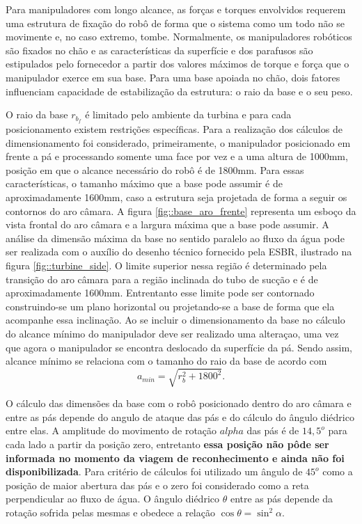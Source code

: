 Para manipuladores com longo alcance, as forças e torques envolvidos requerem
uma estrutura de fixação do robô de forma que o sistema como um todo não se
movimente e, no caso extremo, tombe. Normalmente, os manipuladores robóticos são
fixados no chão e as características da superfície e dos parafusos são
estipulados pelo fornecedor a partir dos valores máximos de torque e força que o
manipulador exerce em sua base. Para uma base apoiada no chão, dois fatores
influenciam capacidade de estabilização da estrutura: o raio da base e o seu
peso.

O raio da base $r_{b_f}$ é limitado pelo ambiente da turbina e para cada
posicionamento existem restrições específicas. 
Para a realização dos cálculos de dimensionamento foi considerado,
primeiramente, o manipulador posicionado em frente a pá e processando somente uma face por vez
e a uma altura de 1000mm, posição em que o alcance necessário do robô é de
1800mm. Para essas características, o tamanho máximo que a base pode assumir é
de aproximadamente 1600mm, caso a estrutura seja projetada de forma a seguir os contornos do aro câmara.
A figura \ref{fig::base_aro_frente} %
representa um esboço da vista frontal do aro câmara e a largura máxima que a
base pode assumir. A análise da dimensão máxima da base no sentido paralelo ao
fluxo da água pode ser realizada com o auxílio do desenho técnico fornecido pela
ESBR, ilustrado na figura \ref{fig::turbine_side}. O limite superior nessa
região é determinado pela transição do aro câmara para a região inclinada do
tubo de sucção e é de aproximadamente 1600mm. Entrentanto esse limite pode ser
contornado construindo-se um plano horizontal ou projetando-se a base de forma que ela acompanhe essa
inclinação. Ao se incluir o dimensionamento da base no cálculo do alcance mínimo
do manipulador deve ser realizado uma alteraçao, uma vez que agora o manipulador
se encontra deslocado da superfície da pá. Sendo assim, alcance mínimo se
relaciona com o tamanho do raio da base de acordo com
$$a_{min}=\sqrt{r_b^2+1800^2}.$$

O cálculo das dimensões da base com o robô posicionado dentro do aro câmara e
entre as pás depende do angulo de ataque das pás e do cálculo do ângulo diédrico
entre elas. A amplitude do movimento de rotação $alpha$ das pás é de $14,5^o$
para cada lado a partir da posição zero, entretanto \textbf{essa posição não pôde ser
informada no momento da viagem de reconhecimento e ainda não foi
disponibilizada}. Para critério de cálculos foi utilizado um ângulo de
$45^o$ como a posição de maior abertura das pás e o zero foi considerado como
a reta perpendicular ao fluxo de água. O ângulo diédrico $\theta$ entre as pás depende da rotação
sofrida pelas mesmas e obedece a relação $\cos{\theta} = \sin^2{\alpha}.$

